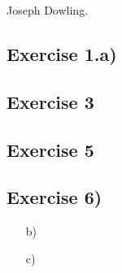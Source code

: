 \documentclass[a4paper, 12pt, twoside]{article}
\author{Joseph}
\begin{document}
Joseph Dowling.
\subsection*{Exercise 1.a)}


\subsection*{Exercise 3}

\subsection*{Exercise 5}

\subsection*{Exercise 6)}
\begin{itemize}
    \item[b)]
    \item[c)]
\end{itemize}
\end{document}
